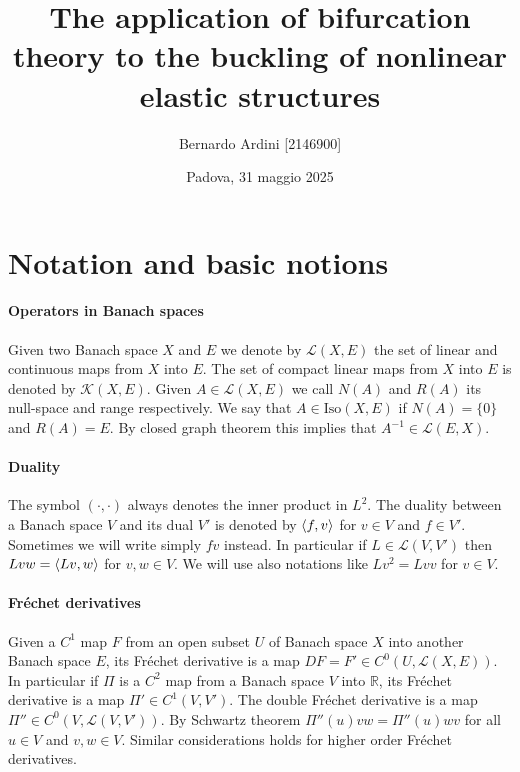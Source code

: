 \documentclass[a4paper,11pt]{article}
\theoremstyle{definition}
\DeclarePairedDelimiter{\dual}{\langle}{\rangle}
\begin{document}
\author{Bernardo Ardini [2146900]}
\date{Padova, 31 maggio 2025}
\title{\bfseries The application of bifurcation theory to the buckling of nonlinear elastic structures}

\maketitle

\tableofcontents

\section{Notation and basic notions}

\paragraph{Operators in Banach spaces} Given two Banach space $X$ and $E$ we denote by $\mathscr{L}(X,E)$ the set of linear and continuous maps from $X$ into $E$. The set of compact linear maps from $X$ into $E$ is denoted by $\mathscr{K}(X,E)$. Given $A\in\mathscr{L}(X,E)$ we call $N(A)$ and $R(A)$ its null-space and range respectively. We say that $A\in\text{Iso}(X,E)$ if $N(A)=\{0\}$ and $R(A)=E$. By closed graph theorem this implies that $A^{-1}\in\mathscr{L}(E,X)$.

\paragraph{Duality} The symbol $(\cdot,\cdot)$ always denotes the inner product in $L^2$. The duality between a Banach space $V$ and its dual $V'$ is denoted by $\dual{f,v}$ for $v\in V$ and $f\in V'$. Sometimes we will write simply $fv$ instead. In particular if $L\in\mathscr{L}(V,V')$ then $Lvw=\dual{Lv,w}$ for $v,w\in V$. We will use also notations like $Lv^2=Lvv$ for $v\in V$.

\paragraph{Fréchet derivatives} Given a $C^1$ map $F$ from an open subset $U$ of Banach space $X$ into another Banach space $E$, its Fréchet derivative is a map $DF=F'\in C^0(U,\mathscr{L}(X,E))$. In particular if $\Pi$ is a $C^2$ map from a Banach space $V$ into $\mathbb{R}$, its Fréchet derivative is a map $\Pi'\in C^1(V,V')$. The double Fréchet derivative is a map $\Pi''\in C^0(V,\mathscr{L}(V,V'))$. By Schwartz theorem $\Pi''(u)vw=\Pi''(u)wv$ for all $u\in V$ and $v,w\in V$. Similar considerations holds for higher order Fréchet derivatives.
\end{document}
